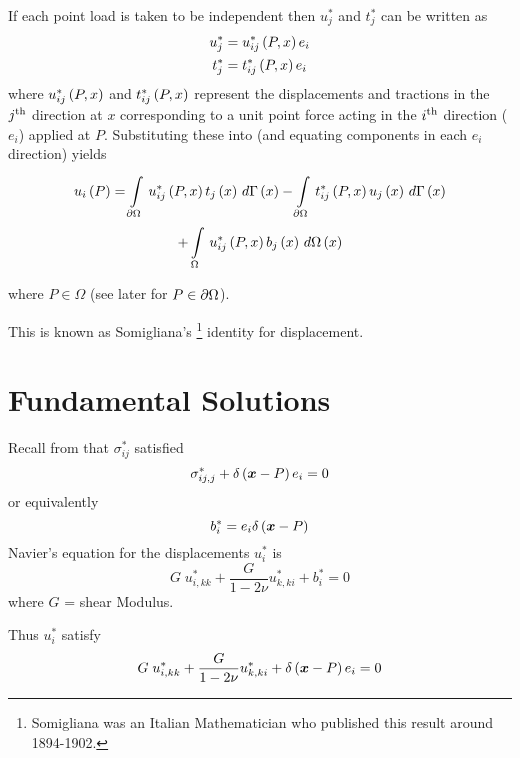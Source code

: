 If each point load is taken to be independent then $u_{j}^{*}$ and $t_{j}^{*}$
can be written as
\begin{align}
  u_{j}^{*} &=  u_{ij}^{*}\left( P,x \right)  e_{i} \\
  t_{j}^{*} &=  t_{ij}^{*}\left( P,x \right)  e_{i}
\end{align}
where $ u_{ij}^{*}\left( P,x \right) $ and $ t_{ij}^{*}\left( P,x \right) $ represent the
displacements and tractions in the ${j}^{\text{th}}$ direction at $x$ corresponding to
a unit point force acting in the ${i}^{\text{th}}$ direction ($e_{i}$) applied at $P$.
Substituting these into  (and equating components in each
$e_{i}$ direction) yields
\begin{multline}
   u_{i}\left( P \right)  =   \displaystyle\int\limits_{\partial \Omega}^{} \, u_{ij}^{*}\left( P,x \right) 
     t_{j}\left( x \right) \,d \Gamma\left( x \right)   -   \displaystyle\int\limits_{\partial
    \Omega}^{} \, t_{ij}^{*}\left( P,x \right)   u_{j}\left( x \right) \,d \Gamma\left( x \right)   \\ 
  +   \displaystyle\int\limits_{\Omega}^{} \, u_{ij}^{*}\left( P,x \right) 
     b_{j}\left( x \right) \,d \Omega\left( x \right)  
 \label{eqn:eqnF}
\end{multline}

where $P \in \Omega$ (see later for $P \in \partial\Omega$).

This is known as Somigliana's \footnote{Somigliana was an Italian
  Mathematician who published this result around 1894-1902.} identity for
displacement.

\section{Fundamental Solutions}

Recall from  that $\sigma_{ij}^{*}$ satisfied
\begin{equation}
  \sigma_{ij,j}^{*} + \fnof{\delta}{\vect{x} - P}e_{i}  = 0 
\end{equation} 
or equivalently
\begin{displaymath}
  b_{i}^{*} = e_{i} \fnof{\delta}{\vect{x} - P}
\end{displaymath}
Navier's equation for the displacements $u_{i}^{*}$ is
\begin{displaymath}
  G\;u_{i,kk}^{*}  +  \dfrac{G}{1-2\nu}u_{k,ki}^{*}  + b_{i}^{*} = 0 
\end{displaymath}
where $G$ = shear Modulus.

Thus $u_{i}^{*}$ satisfy
\begin{equation}
  G\;u_{i,kk}^{*}  +  \dfrac{G}{1-2\nu}u_{k,ki}^{*} + \fnof{\delta}{\vect{x} -
    P}e_{i} = 0 
  \label{eqn:satisfy}
\end{equation}

